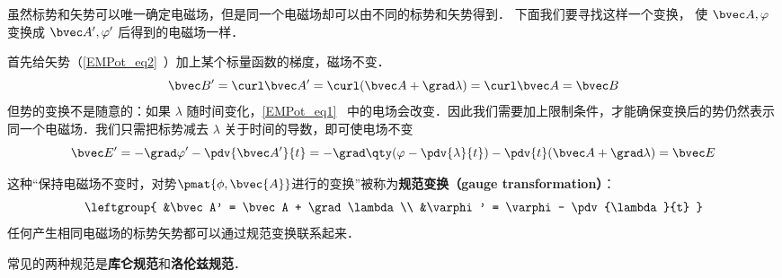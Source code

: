 
\begin{issues}
\issueDraft
\end{issues}


虽然标势和矢势可以唯一确定电磁场，但是同一个电磁场却可以由不同的标势和矢势得到． 下面我们要寻找这样一个变换， 使 $\bvec A, \varphi$ 变换成 $\bvec A', \varphi'$ 后得到的电磁场一样．

首先给矢势（\autoref{EMPot_eq2}~）加上某个标量函数的梯度，磁场不变．
\begin{equation}
\bvec B' = \curl \bvec A' = \curl (\bvec A + \grad \lambda) = \curl \bvec A = \bvec B
\end{equation}
但势的变换不是随意的：如果 $\lambda$ 随时间变化，\autoref{EMPot_eq1}~ 中的电场会改变．因此我们需要加上限制条件，才能确保变换后的势仍然表示同一个电磁场．我们只需把标势减去 $\lambda$ 关于时间的导数，即可使电场不变
\begin{equation}
\bvec E' = -\grad \varphi' - \pdv{\bvec A'}{t} = -\grad \qty(\varphi - \pdv{\lambda}{t}) - \pdv{t} (\bvec A + \grad \lambda) = \bvec E
\end{equation}


这种“保持电磁场不变时，对势$\pmat{\phi, \bvec{A}}$进行的变换”被称为\textbf{规范变换（gauge transformation）}：
\begin{equation}\label{Gauge_eq3}
\leftgroup{
&\bvec A' = \bvec A + \grad \lambda\\
&\varphi' = \varphi - \pdv{\lambda}{t}
}\end{equation}
任何产生相同电磁场的标势矢势都可以通过规范变换联系起来．

常见的两种规范是\textbf{库仑规范}和\textbf{洛伦兹规范}．
